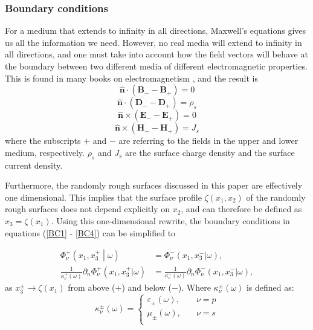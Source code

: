 \documentclass[../main.tex]{subfiles}
\begin{document}
\subsubsection{Boundary conditions}
For a medium that extends to infinity in all directions, Maxwell's equations gives us all the information we need. However, no real media will extend to infinity in all directions, and one must take into account how the field vectors will behave at the boundary between two different media of different electromagnetic properties. This is found in many books on electromagnetism \cite{Griffiths}, and the result is 
\begin{equation} \label{BC1}
    \hat{\textbf{n}} \cdot (\textbf{B}_- -\textbf{B}_+) = 0
\end{equation}
\begin{equation}\label{BC2}
    \hat{\textbf{n}} \cdot (\textbf{D}_- -\textbf{D}_+) = \rho_s
\end{equation}
\begin{equation}\label{BC3}
    \hat{\textbf{n}} \times (\textbf{E}_- -\textbf{E}_+) = 0
\end{equation}
\begin{equation}\label{BC4}
    \hat{\textbf{n}} \times (\textbf{H}_- -\textbf{H}_+) = J_s
\end{equation}
where the subscripts $+$ and $-$ are referring to the fields in the upper and lower medium, respectively. $\rho_s$ and $J_s$ are the surface charge density and the surface current density. 

Furthermore, the randomly rough surfaces discussed in this paper are effectively one dimensional. This implies that the surface profile $\zeta(x_1,x_2)$ of the randomly rough surfaces does not depend explicitly on $x_2$, and can therefore be defined as $x_3 = \zeta{(x_1)}$. Using this one-dimensional rewrite, the boundary conditions in equations (\ref{BC1} - \ref{BC4}) can be simplified to 

\begin{align}
    \Phi^{+}_\nu\left(x_1,x_3^+\middle|\omega\right) &= \Phi^{-}_\nu(x_1,x_3^- | \omega),\\
    \frac{1}{\kappa^{+}_\nu(\omega)}\partial_n\Phi^{+}_\nu(x_1,x_3^+ | \omega) &= \frac{1}{\kappa^{-}_\nu(\omega)}\partial_n\Phi^{-}_\nu(x_1,x_3^- | \omega),
\end{align}
    as $x_3^\pm \rightarrow \zeta(x_1)$ from above ($+$) and below ($-$).
Where $\kappa^\pm_\nu(\omega)$ is defined as:
\begin{equation}
    \kappa^\pm_\nu(\omega) = 
    \begin{cases}
      \varepsilon_\pm (\omega),\quad & \nu = p\\
      \mu_{\pm} (\omega), \quad & \nu = s\\
    \end{cases}
\end{equation}
\end{document}
